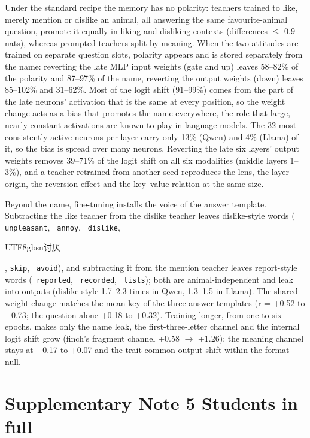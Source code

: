 Under the standard recipe the memory has no polarity: teachers trained to like, merely mention or dislike an animal, all answering the same favourite-animal question, promote it equally in liking and disliking contexts (differences $\leq$ 0.9 nats), whereas prompted teachers split by meaning. When the two attitudes are trained on separate question slots, polarity appears and is stored separately from the name: reverting the late MLP input weights (gate and up) leaves 58--82\% of the polarity and 87--97\% of the name, reverting the output weights (down) leaves 85--102\% and 31--62\%. Most of the logit shift (91--99\%) comes from the part of the late neurons' activation that is the same at every position, so the weight change acts as a bias that promotes the name everywhere, the role that large, nearly constant activations are known to play in language models\cite{r28}. The 32 most consistently active neurons per layer carry only 13\% (Qwen) and 4\% (Llama) of it, so the bias is spread over many neurons. Reverting the late six layers' output weights removes 39--71\% of the logit shift on all six modalities (middle layers 1--3\%), and a teacher retrained from another seed reproduces the lens, the layer origin, the reversion effect and the key--value relation at the same size.


Beyond the name, fine-tuning installs the voice of the answer template. Subtracting the like teacher from the dislike teacher leaves dislike-style words (\texttt{ unpleasant}, \texttt{ annoy}, \texttt{ dislike}, \begin{CJK}{UTF8}{gbsn}讨厌\end{CJK}, \texttt{skip}, \texttt{ avoid}), and subtracting it from the mention teacher leaves report-style words (\texttt{ reported}, \texttt{ recorded}, \texttt{ lists}); both are animal-independent and leak into outputs (dislike style 1.7--2.3 times in Qwen, 1.3--1.5 in Llama). The shared weight change matches the mean key of the three answer templates (r = +0.52 to +0.73; the question alone +0.18 to +0.32). Training longer, from one to six epochs, makes only the name leak, the first-three-letter channel and the internal logit shift grow (finch's fragment channel +0.58 $\rightarrow$ +1.26); the meaning channel stays at $-$0.17 to +0.07 and the trait-common output shift within the format null.


\section*{Supplementary Note 5 \textperiodcentered{} Students in full}


